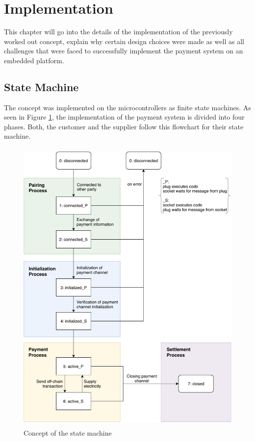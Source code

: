 \section{Implementation}
This chapter will go into the details of the implementation of the previously worked out concept, explain why certain design choices were made as well as all challenges that were faced to successfully implement the payment system on an embedded platform.
\\
\subsection{State Machine}
The concept was implemented on the microcontrollers as finite state machines.
As seen in Figure \ref{fig:state_machine}, the implementation of the payment system is divided into four phases.
Both, the customer and the supplier follow this flowchart for their state machine.
\\
\begin{figure}[H]
  \begin{center}
    \includegraphics[height=15cm]{img/state_machine.pdf}
    \caption{Concept of the state machine}
    \label{fig:state_machine}
  \end{center}
\end{figure}
